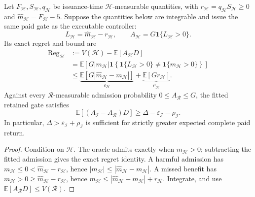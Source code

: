\begin{proposition}
\label{prop:final-fitted-paid-benefit}
Let $F_{\mathcal H},S_{\mathcal H},q_{\mathcal H}$ be issuance-time
$\mathcal H$-measurable quantities, with
$r_{\mathcal H}=q_{\mathcal H}S_{\mathcal H}\geq0$ and
$\widehat m_{\mathcal H}=F_{\mathcal H}-5$.  Suppose the quantities below
are integrable and issue the same paid gate as the executable controller:
\begin{equation}
 L_{\mathcal H}=\widehat m_{\mathcal H}-r_{\mathcal H},\qquad
 A_{\mathcal H}=G\mathbf1\{L_{\mathcal H}>0\}.
 \label{eq:final-fitted-paid-gate}
\end{equation}
Its exact regret and bound are
\begin{align}
 \operatorname{Reg}_{\mathcal H}
 &:=V(\mathcal H)-\mathbb E[A_{\mathcal H}D]\nonumber\\
 &=\mathbb E\!\left[G|m_{\mathcal H}|\mathbf1\left\{
 \mathbf1\{L_{\mathcal H}>0\}\ne\mathbf1\{m_{\mathcal H}>0\}
 \right\}\right]\nonumber\\
 &\leq\underbrace{\mathbb E[G|\widehat m_{\mathcal H}-m_{\mathcal H}|]}
                 _{\varepsilon_{\mathcal H}}
       +\underbrace{\mathbb E[Gr_{\mathcal H}]}_{\rho_{\mathcal H}}.
 \label{eq:final-fitted-paid-regret}
\end{align}
Against every $\mathcal R$-measurable admission probability
$0\leq A_{\mathcal R}\leq G$, the fitted retained gate satisfies
\begin{equation}
 \mathbb E[(A_{\mathcal I}-A_{\mathcal R})D]
 \geq\Delta-\varepsilon_{\mathcal I}-\rho_{\mathcal I}.
 \label{eq:final-fitted-paid-improvement}
\end{equation}
In particular, $\Delta>\varepsilon_{\mathcal I}+\rho_{\mathcal I}$ is
sufficient for strictly greater expected complete paid return.
\end{proposition}
\begin{proof}
Condition on $\mathcal H$.  The oracle admits exactly when
$m_{\mathcal H}>0$; subtracting the fitted admission gives the exact
regret identity.  A harmful admission has
$m_{\mathcal H}\leq0<\widehat m_{\mathcal H}-r_{\mathcal H}$, hence
$|m_{\mathcal H}|\leq|\widehat m_{\mathcal H}-m_{\mathcal H}|$.
A missed benefit has
$m_{\mathcal H}>0\geq\widehat m_{\mathcal H}-r_{\mathcal H}$, hence
$m_{\mathcal H}\leq|\widehat m_{\mathcal H}-m_{\mathcal H}|+r_{\mathcal H}$.
Integrate, and use $\mathbb E[A_{\mathcal R}D]\leq V(\mathcal R)$.
\end{proof}


